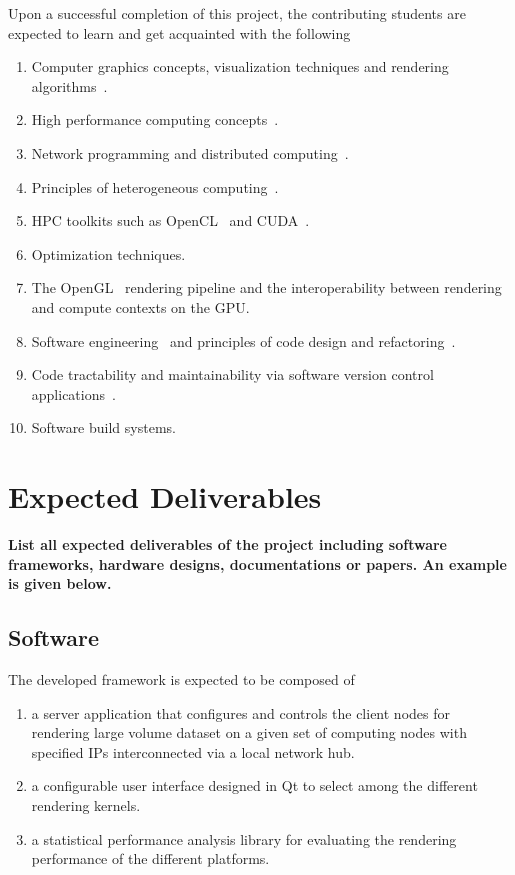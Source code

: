 \documentclass[12pt]{article} 				%
\begin{document}
\vspace*{1cm}

Upon a successful completion of this project, the contributing students are expected to learn and get acquainted with the following 
\begin{enumerate}
\item Computer graphics concepts, visualization techniques and rendering algorithms~\cite{volume-rendering}. 
\item High performance computing concepts~\cite{what-is-hpc}.  
\item Network programming and distributed computing~\cite{client-server-model}.
\item Principles of heterogeneous computing~\cite{heterogeneous-computing}.
\item \acs{HPC} toolkits such as \acs{OpenCL}~\cite{opencl} and \acs{CUDA}~\cite{cuda}.
\item Optimization techniques. 
\item The \acs{OpenGL}~\cite{opengl} rendering pipeline and the interoperability between rendering and compute contexts on the \acs{GPU}.
\item Software engineering~\cite{software-engineering} and principles of code design and refactoring~\cite{refactoring}.
\item Code tractability and maintainability via software version control applications~\cite{version-control}. 
\item Software build systems\cite{software-build}. 
\end{enumerate} 
  
\section{Expected Deliverables} \label{section:expected-deliverables}

\textbf{List all expected deliverables of the project including software frameworks, hardware designs, documentations or papers. An example is given below.}

\subsection{Software}

The developed framework is expected to be composed of 
\begin{enumerate}
\item a server application that configures and controls the client nodes for rendering large volume dataset on a given set of computing nodes with specified \acs{IP}s interconnected via a local network hub.
\item a configurable user interface designed in Qt to select among the different rendering kernels.
\item a statistical performance analysis library for evaluating the rendering performance of the different platforms.
\end{enumerate}
\end{document}
